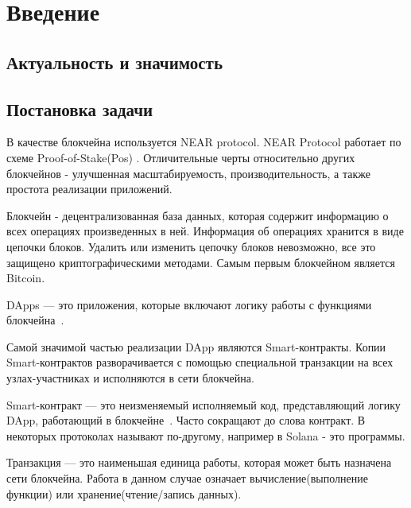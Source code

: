 \section{Введение}
\subsection{Актуальность и значимость}

\subsection{Постановка задачи}
В качестве блокчейна используется NEAR protocol\cite{nearprotocol_2022}. NEAR Protocol работает по схеме Proof-of-Stake(Pos) \cite{nearprotocolpos}. Отличительные черты относительно других блокчейнов - улучшенная масштабируемость, производительность, а также простота реализации приложений.

\begin{definition}
    Блокчейн - децентрализованная база данных, которая содержит информацию о всех операциях произведенных в ней.
    Информация об операциях хранится в виде цепочки блоков.  Удалить или изменить цепочку блоков невозможно, все это защищено криптографическими методами. Самым первым блокчейном является Bitcoin\cite{nakamoto2012bitcoin}.
\end{definition}

\begin{definition}
    DApps --- это приложения, которые включают логику работы с функциями блокчейна~\cite{ramamurthy2020blockchain}.
\end{definition}

Самой значимой частью реализации DApp являются Smart-контракты. Копии Smart-контрактов разворачивается с помощью специальной транзакции на всех узлах-участниках и исполняются в сети блокчейна.

\begin{definition}
    Smart-контракт --- это неизменяемый исполняемый код, представляющий логику DApp, работающий в блокчейне~\cite{ramamurthy2020blockchain}. Часто сокращают до слова контракт. В некоторых протоколах называют по-другому, например в Solana - это программы\cite{solanaprogramlibrarydocs}.
\end{definition}

\begin{definition}
    Транзакция — это наименьшая единица работы, которая может быть назначена сети блокчейна. Работа в данном случае означает вычисление(выполнение функции) или хранение(чтение/запись данных)\cite{neardocumentationtransaction}.
\end{definition}

